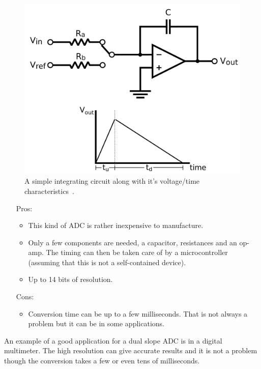 \documentclass[11pt,a4paper,titlepage]{article}
\begin{document}
	\begin{figure}[h]
		\centering
		\includegraphics[width=\textwidth]{graphics/dualslope}
		\caption{A simple integrating circuit along with it's voltage/time characteristics~\cite{dualslope}.}
		\label{fig:dualslope}
	\end{figure}
	
	\begin{itemize}
		\item[Pros:]
		\begin{itemize}
			\item This kind of ADC is rather inexpensive to manufacture.
			\item Only a few components are needed, a capacitor, resistances and an op-amp. The timing can then be taken care of by a microcontroller (assuming that this is not a self-contained device). 
			\item Up to 14 bits of resolution.
		\end{itemize}
		\item[Cons:]
		\begin{itemize}
			\item Conversion time can be up to a few milliseconds. That is not always a problem but it can be in some applications.
		\end{itemize}
	\end{itemize}
	
	\noindent An example of a good application for a dual slope ADC is in a digital multimeter. The high resolution can give accurate results and it is not a problem though the conversion takes a few or even tens of milliseconds.
	
\end{document}
